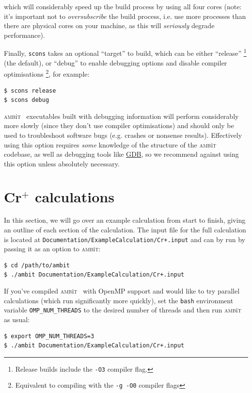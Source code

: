 \documentclass{report}
\newcommand{\ambit}{\textsc{amb}{\footnotesize i}\textsc{t}}
\begin{document}
which will considerably speed up the build process by using all four cores (note: it's important not to
\textit{oversubscribe} the build process, i.e. use more processes than there are physical cores on your 
machine, as this will \emph{seriously} degrade performance).

Finally, \texttt{scons} takes an optional ``target'' to build, which can be either ``release''
\footnote{Release builds include the \texttt{-O3} compiler flag.} (the default), or ``debug'' to 
enable debugging options and disable compiler optimisations \footnote{Equivalent to compiling with the
\texttt{-g -O0} compiler flags}, for example:

\begin{verbatim}
$ scons release
$ scons debug
\end{verbatim}

\ambit~ executables built with debugging information will perform considerably more slowly (since they
don't use compiler optimisations) and should only be used to troubleshoot software bugs (e.g. crashes or
nonsense results). Effectively using this option requires \emph{some} knowledge of the structure of the
\ambit~ codebase, as well as debugging tools like \href{https://www.gnu.org/software/gdb/}{GDB}, so we
recommend against using this option unless absolutely necessary.

\section{Cr$^+$ calculations}

In this section, we will go over an example calculation from start to finish, giving an outline of each
section of the calculation. The input file for the full calculation is located at 
\texttt{Documentation/ExampleCalculation/Cr+.input} and can by run by passing it as an option to
\ambit:

\begin{verbatim}
$ cd /path/to/ambit
$ ./ambit Documentation/ExampleCalculation/Cr+.input
\end{verbatim}

If you've compiled \ambit~ with OpenMP support and would like to try parallel calculations (which run
significantly more quickly), set the \texttt{bash} environment variable \texttt{OMP\_NUM\_THREADS} to
the desired number of threads and then run \ambit~ as usual:

\begin{verbatim}
$ export OMP_NUM_THREADS=3
$ ./ambit Documentation/ExampleCalculation/Cr+.input
\end{verbatim}
\end{document}
